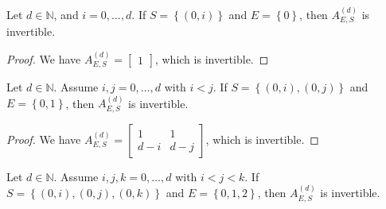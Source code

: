 \begin{proposition}\label{prop:impossible-support-23233243243423}
    Let \( d \in \mathbb{N} \), and \( i=0, \dots, d \). If \( S = \left\{ (0,i) \right\} \) and \( E = \left\{ 0 \right\} \), then \( A^{(d)}_{E,S} \) is invertible.
\end{proposition}

\begin{proof}
    We have \( A^{(d)}_{E,S} = \begin{bmatrix}
        1
    \end{bmatrix} \), which is invertible.
\end{proof}

\begin{proposition}\label{prop:impossible-support-232423}
    Let \( d \in \mathbb{N} \). Assume \( i,j=0, \dots, d \) with \( i < j \). If \( S = \left\{ (0,i), (0,j) \right\} \) and \( E = \left\{ 0,1 \right\} \), then \( A^{(d)}_{E,S} \) is invertible.
\end{proposition}

\begin{proof}
    We have \( A^{(d)}_{E,S} = \begin{bmatrix}
        1 & 1 \\ d-i & d-j
    \end{bmatrix} \), which is invertible.
\end{proof}

\begin{proposition}\label{prop:impossible-support-2}
    Let \( d \in \mathbb{N} \). Assume \( i,j,k=0, \dots, d \) with \( i < j < k \). If \( S = \left\{ (0,i), (0,j), (0,k) \right\} \) and \( E = \left\{ 0,1,2 \right\} \), then \( A^{(d)}_{E,S} \) is invertible.
\end{proposition}

